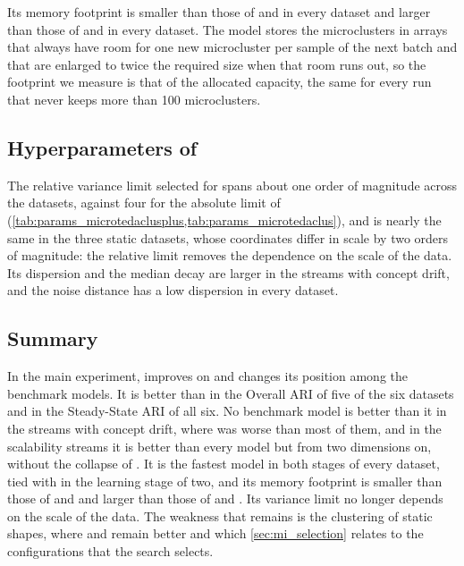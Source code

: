 Its memory footprint is smaller than those of \MicroTEDAClus and \CluStream in every dataset and larger than those of \CEDAS and \TEDACloud in every dataset. The model stores the microclusters in arrays that always have room for one new microcluster per sample of the next batch and that are enlarged to twice the required size when that room runs out, so the footprint we measure is that of the allocated capacity, the same for every run that never keeps more than 100 microclusters.

\subsection{Hyperparameters of \MicroTEDAClusPlus}
\label{subsec:mi_main_parameters}



The relative variance limit selected for \MicroTEDAClusPlus spans about one order of magnitude across the datasets, against four for the absolute limit of \MicroTEDAClus (\cref{tab:params_microtedaclusplus,tab:params_microtedaclus}), and is nearly the same in the three static datasets, whose coordinates differ in scale by two orders of magnitude: the relative limit removes the dependence on the scale of the data. Its dispersion and the median decay are larger in the streams with concept drift, and the noise distance has a low dispersion in every dataset.

\subsection{Summary}
\label{subsec:mi_main_summary}

In the main experiment, \MicroTEDAClusPlus improves on \MicroTEDAClus and changes its position among the benchmark models. It is better than \MicroTEDAClus in the Overall ARI of five of the six datasets and in the Steady-State ARI of all six. No benchmark model is better than it in the streams with concept drift, where \MicroTEDAClus was worse than most of them, and in the scalability streams it is better than every model but \CEDAS from two dimensions on, without the collapse of \MicroTEDAClus. It is the fastest model in both stages of every dataset, tied with \CEDAS in the learning stage of two, and its memory footprint is smaller than those of \MicroTEDAClus and \CluStream and larger than those of \CEDAS and \TEDACloud. Its variance limit no longer depends on the scale of the data. The weakness that remains is the clustering of static shapes, where \CluStream and \StreamKM remain better and which \cref{sec:mi_selection} relates to the configurations that the search selects.
